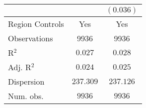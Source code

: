 \begin{center}
\begin{tiny}
\begin{longtable}{l@{} c@{} c@{}}
                                                                           &                  & $(0.036)$        \\
\hline
Region Controls                                                            & Yes              & Yes              \\
Observations                                                               & 9936             & 9936             \\
R$^2$                                                                      & $0.027$          & $0.028$          \\
Adj. R$^2$                                                                 & $0.024$          & $0.025$          \\
Dispersion                                                                 & $237.309$        & $237.126$        \\
Num. obs.                                                                  & $9936$           & $9936$           \\
\end{longtable}
\end{tiny}
\end{center}
